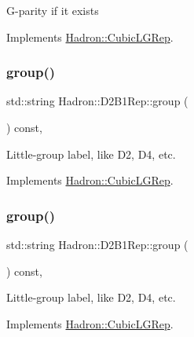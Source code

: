 G-\/parity if it exists 

Implements \mbox{\hyperlink{structHadron_1_1CubicLGRep_ace26f7b2d55e3a668a14cb9026da5231}{Hadron\+::\+Cubic\+L\+G\+Rep}}.

\mbox{\label{structHadron_1_1D2B1Rep_aa089e3f39579397519c844b305a926b9}} 
\subsubsection{\texorpdfstring{group()}{group()}\hspace{0.1cm}{\footnotesize\ttfamily [1/3]}}
{\footnotesize\ttfamily std\+::string Hadron\+::\+D2\+B1\+Rep\+::group (\begin{DoxyParamCaption}{ }\end{DoxyParamCaption}) const\hspace{0.3cm}{\ttfamily [inline]}, {\ttfamily [virtual]}}

Little-\/group label, like D2, D4, etc. 

Implements \mbox{\hyperlink{structHadron_1_1CubicLGRep_a9bdb14b519a611d21379ed96a3a9eb41}{Hadron\+::\+Cubic\+L\+G\+Rep}}.

\mbox{\label{structHadron_1_1D2B1Rep_aa089e3f39579397519c844b305a926b9}} 
\subsubsection{\texorpdfstring{group()}{group()}\hspace{0.1cm}{\footnotesize\ttfamily [2/3]}}
{\footnotesize\ttfamily std\+::string Hadron\+::\+D2\+B1\+Rep\+::group (\begin{DoxyParamCaption}{ }\end{DoxyParamCaption}) const\hspace{0.3cm}{\ttfamily [inline]}, {\ttfamily [virtual]}}

Little-\/group label, like D2, D4, etc. 

Implements \mbox{\hyperlink{structHadron_1_1CubicLGRep_a9bdb14b519a611d21379ed96a3a9eb41}{Hadron\+::\+Cubic\+L\+G\+Rep}}.

\mbox{\label{structHadron_1_1D2B1Rep_aa089e3f39579397519c844b305a926b9}} 
